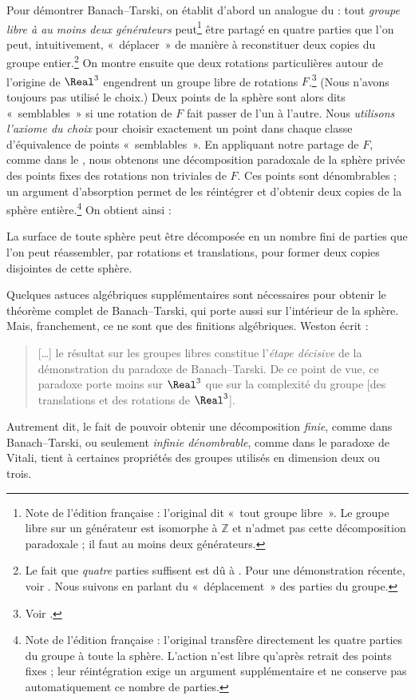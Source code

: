 \documentclass[../../../include/open-logic-section]{subfiles}
\begin{document}
Pour démontrer Banach--Tarski,
on établit d'abord un analogue
du  :
tout \emph{groupe libre à au moins
deux générateurs} peut\footnote{
Note de l'édition française :
l'original dit «~tout groupe libre~».
Le groupe libre sur un générateur
est isomorphe à $\mathbb{Z}$ et
n'admet pas cette décomposition
paradoxale ; il faut au moins
deux générateurs.}
être partagé en quatre parties
que l'on peut, intuitivement,
«~déplacer~» de manière à
reconstituer deux copies
du groupe entier.\footnote{
Le fait que \emph{quatre}
parties suffisent est dû à
\cite{Robinson1947}.
Pour une démonstration récente,
voir \citet[Theorem 5.2]{Wagon2016}.
Nous suivons \citet[p.~3]{Weston2003}
en parlant du «~déplacement~»
des parties du groupe.}
On montre ensuite que deux
rotations particulières autour
de l'origine de $\Real^3$
engendrent un groupe libre
de rotations $F$.\footnote{
Voir \citet[Theorem 2.1]{Wagon2016}.}
(Nous n'avons toujours pas
utilisé le choix.)
Deux points de la sphère
sont alors dits «~semblables~»
si une rotation de $F$
fait passer de l'un à l'autre.
Nous \emph{utilisons l'axiome
du choix} pour choisir exactement
un point dans chaque classe
d'équivalence de points
«~semblables~».
En appliquant notre partage de $F$, comme
dans le , nous obtenons une décomposition
paradoxale de la sphère privée des points
fixes des rotations non triviales de $F$.
Ces points sont dénombrables ; un argument d'absorption permet
de les réintégrer et d'obtenir deux copies
de la sphère entière.\footnote{Note de l'édition française : l'original transfère directement les quatre parties du groupe à toute la sphère. L'action n'est libre qu'après retrait des points fixes ; leur réintégration exige un argument supplémentaire et ne conserve pas automatiquement ce nombre de parties.}
On obtient ainsi
\citep{Hausdorff1914} :

\begin{thm}
La surface de toute sphère
peut être décomposée en un
nombre fini de parties que
l'on peut réassembler,
par rotations et translations,
pour former deux copies
disjointes de cette sphère.
\end{thm}

Quelques astuces algébriques
supplémentaires sont nécessaires
pour obtenir le théorème
complet de Banach--Tarski,
qui porte aussi sur l'intérieur
de la sphère. Mais, franchement,
ce ne sont que des finitions
algébriques. Weston écrit :
\begin{quote}
	[\ldots] le résultat sur
	les groupes libres constitue
	l'\emph{étape décisive}
	de la démonstration du paradoxe
	de Banach--Tarski. De ce
	point de vue, ce paradoxe
	porte moins sur $\Real^3$
	que sur la complexité
	du groupe [des translations
	et des rotations de $\Real^3$].
	\cite[p.~16]{Weston2003}
\end{quote}
Autrement dit, le fait de pouvoir
obtenir une décomposition
\emph{finie}, comme dans
Banach--Tarski, ou seulement
\emph{infinie dénombrable},
comme dans le paradoxe de Vitali,
tient à certaines propriétés
des groupes utilisés en
dimension deux ou trois.
\end{document}
